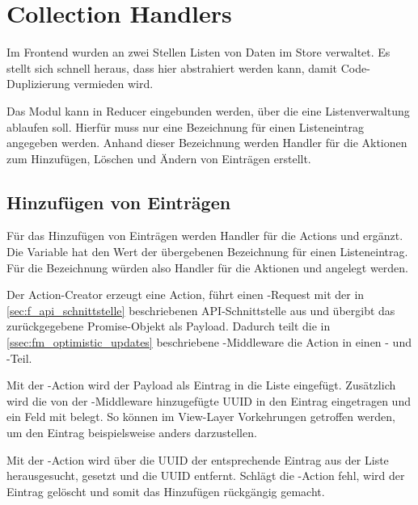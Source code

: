 \section{Collection Handlers}
\label{sec:f_collection_handlers}

Im Frontend wurden an zwei Stellen Listen von Daten im Store verwaltet.  Es
stellt sich schnell heraus, dass hier abstrahiert werden kann, damit
Code-Duplizierung vermieden wird.

Das Modul  kann in Reducer eingebunden werden, über
die eine Listenverwaltung ablaufen soll.  Hierfür muss nur eine Bezeichnung für
einen Listeneintrag angegeben werden.  Anhand dieser Bezeichnung werden Handler
für die Aktionen zum Hinzufügen, Löschen und Ändern von Einträgen erstellt.

\subsection{Hinzufügen von Einträgen}
\label{ssec:fc_hinzufuegen_von_eintraegen}

Für das Hinzufügen von Einträgen werden Handler für die Actions
 und 
ergänzt.  Die Variable  hat den Wert der übergebenen
Bezeichnung für einen Listeneintrag.  Für die Bezeichnung  würden
also Handler für die Aktionen  und
 angelegt werden.

Der Action-Creator erzeugt eine  Action, führt einen
-Request mit der in \cref{sec:f_api_schnittstelle} beschriebenen
API-Schnittstelle aus und übergibt das zurückgegebene Promise-Objekt als
Payload.  Dadurch teilt die in \cref{ssec:fm_optimistic_updates} beschriebene
-Middleware die Action in einen - und
-Teil.

Mit der -Action wird der Payload als Eintrag in die Liste
eingefügt.  Zusätzlich wird die von der -Middleware
hinzugefügte UUID in den Eintrag eingetragen und ein Feld  mit
 belegt.  So können im View-Layer Vorkehrungen getroffen werden,
um den Eintrag beispielsweise anders darzustellen.

Mit der -Action wird über die UUID der entsprechende Eintrag
aus der Liste herausgesucht,   gesetzt und die UUID
entfernt.  Schlägt die -Action fehl, wird der Eintrag gelöscht
und somit das Hinzufügen rückgängig gemacht.

